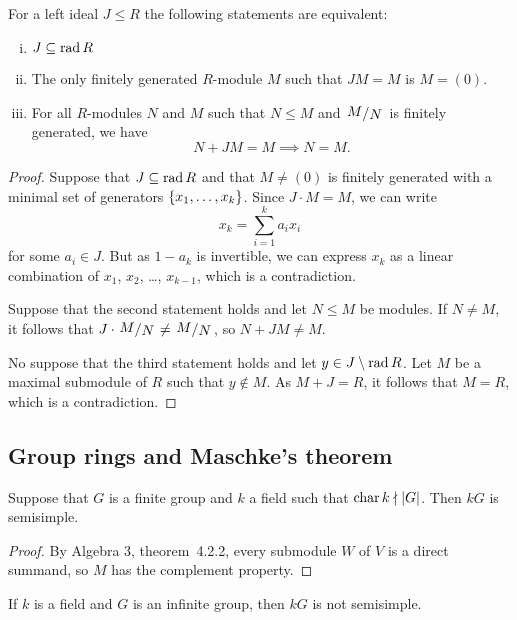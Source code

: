 \begin{lema}[Nakayama]
For a left ideal $J \leq R$ the following statements are
equivalent:

\begin{enumerate}[i)]
\item $J \subseteq \operatorname{rad} R$
\item The only finitely generated $R$-module $M$ such that
$JM = M$ is $M = (0)$.
\item For all $R$-modules $N$ and $M$ such that $N \leq M$ and
$\kvoc{M}{N}$ is finitely generated, we have
\[
N + J M = M \implies N = M.
\]
\end{enumerate}
\end{lema}

\begin{proof}
Suppose that $J \subseteq \operatorname{rad} R$ and that $M \ne (0)$ is finitely
generated with a minimal set of generators $\left\{x_1, \dots, x_k\right\}$.
Since $J \cdot M = M$, we can write
\[
x_k = \sum_{i=1}^k a_i x_i
\]
for some $a_i \in J$. But as $1 - a_k$ is invertible, we can
express $x_k$ as a linear combination of $x_1$, $x_2$, \dots,
$x_{k-1}$, which is a contradiction.

Suppose that the second statement holds and let $N \leq M$ be
modules. If $N \ne M$, it follows that
$J \cdot \kvoc{M}{N} \ne \kvoc{M}{N}$, so $N + JM \ne M$.

No suppose that the third statement holds and let
$y \in J \setminus \operatorname{rad} R$. Let $M$ be a maximal submodule of $R$
such that $y \not \in M$. As $M + J = R$, it follows that $M = R$,
which is a contradiction.
\end{proof}

\newpage

\subsection{Group rings and Maschke's theorem}

\begin{izrek}[Maschke]
Suppose that $G$ is a finite group and $k$ a field such that
$\operatorname{char} k \nmid \left\lvert G\right\rvert$. Then $kG$ is semisimple.
\end{izrek}

\begin{proof}
By Algebra 3, theorem~4.2.2, every submodule $W$ of $V$ is a direct
summand, so $M$ has the complement property.
\end{proof}

\begin{trditev}
If $k$ is a field and $G$ is an infinite group, then $kG$ is not
semisimple.
\end{trditev}

